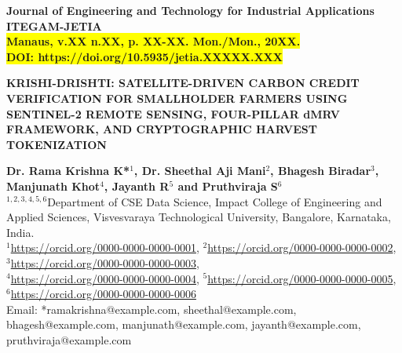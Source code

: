 \documentclass[10pt,a4paper]{article}
\begin{document}
\begin{center}
    {\Large \textbf{Journal of Engineering and Technology for Industrial Applications}} \\
    \vspace{0.2cm}
    {\huge \textbf{ITEGAM-JETIA}} \\
    \vspace{0.2cm}
    \colorbox{yellow}{\textbf{Manaus, v.XX n.XX, p. XX-XX. Mon./Mon., 20XX.}} \\
    \colorbox{yellow}{\textbf{DOI: https://doi.org/10.5935/jetia.XXXXX.XXX}}
\end{center}

\vspace{0.3cm}
\noindent\colorbox{navyblue}{}
\vspace{0.5cm}

\vspace{0.4cm}
\noindent{\color{navyblue}\rule{\textwidth}{1.5pt}}
\vspace{0.3cm}

\begin{center}
    {\Large \textbf{\color{navyblue}KRISHI-DRISHTI: SATELLITE-DRIVEN CARBON CREDIT VERIFICATION FOR SMALLHOLDER FARMERS USING SENTINEL-2 REMOTE SENSING, FOUR-PILLAR dMRV FRAMEWORK, AND CRYPTOGRAPHIC HARVEST TOKENIZATION}}
\end{center}

\vspace{0.2cm}
\noindent{\color{navyblue}\rule{\textwidth}{2.5pt}}
\vspace{0.4cm}

\begin{center}
    {\normalsize \textbf{Dr. Rama Krishna K*$^1$, Dr. Sheethal Aji Mani$^2$, Bhagesh Biradar$^3$, Manjunath Khot$^4$, Jayanth R$^5$ and Pruthviraja S$^6$}} \\
    \vspace{0.4cm}
    {\small $^{1,2,3,4,5,6}$Department of CSE Data Science, Impact College of Engineering and Applied Sciences, Visvesvaraya Technological University, Bangalore, Karnataka, India.} \\
    \vspace{0.3cm}
    {\footnotesize
    $^1$\url{https://orcid.org/0000-0000-0000-0001},
    $^2$\url{https://orcid.org/0000-0000-0000-0002},
    $^3$\url{https://orcid.org/0000-0000-0000-0003}, \\
    $^4$\url{https://orcid.org/0000-0000-0000-0004},
    $^5$\url{https://orcid.org/0000-0000-0000-0005},
    $^6$\url{https://orcid.org/0000-0000-0000-0006}} \\
    \vspace{0.2cm}
    {\small Email: *ramakrishna@example.com, sheethal@example.com, bhagesh@example.com, manjunath@example.com, jayanth@example.com, pruthviraja@example.com}
\end{center}
\end{document}
